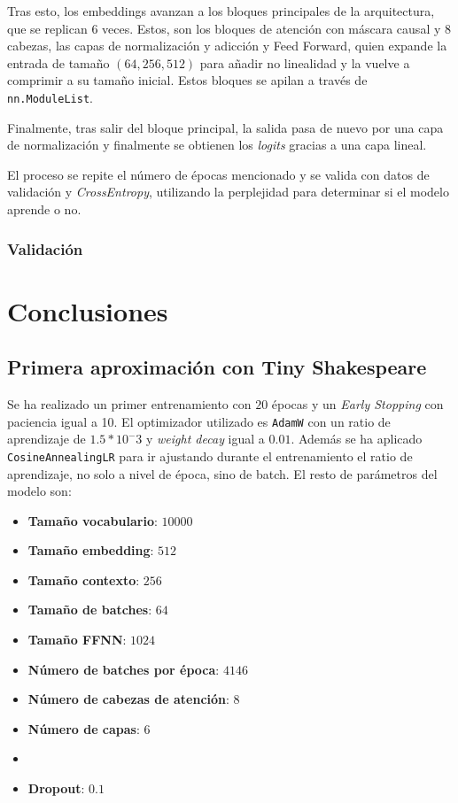 \documentclass[11pt]{book}
\newcommand{\clearemptydoublepage}{\newpage{\pagestyle{empty}\cleardoublepage}}
\theoremstyle{plain}
\theoremstyle{definition}
\begin{document}
Tras esto, los embeddings avanzan a los bloques principales de la arquitectura, que se replican $6$ veces. Estos, son los bloques de atención con máscara causal y 8 cabezas, las capas de normalización y adicción y Feed Forward, quien expande la entrada de tamaño $(64,256, 512)$ para añadir no linealidad y la vuelve a comprimir a su tamaño inicial. Estos bloques se apilan a través de \texttt{nn.ModuleList}. 

Finalmente, tras salir del bloque principal, la salida pasa de nuevo por una capa de normalización y finalmente se obtienen los \textit{logits} gracias a una capa lineal. 

El proceso se repite el número de épocas mencionado y se valida con datos de validación y \textit{CrossEntropy}, utilizando la perplejidad para determinar si el modelo aprende o no.


\subsection{Validación} \label{subsec:validacion}






\clearemptydoublepage

\chapter{Conclusiones}

\section{Primera aproximación con Tiny Shakespeare}

Se ha realizado un primer entrenamiento con $20$ épocas y un \textit{Early Stopping} con paciencia igual a 10. El optimizador utilizado es \texttt{AdamW} con un ratio de aprendizaje de $1.5*10^-3$ y \textit{weight decay} igual a $0.01$. Además se ha aplicado \texttt{CosineAnnealingLR} para ir ajustando durante el entrenamiento el ratio de aprendizaje, no solo a nivel de época, sino de batch. El resto de parámetros del modelo son: 

\begin{itemize}
    \item \textbf{Tamaño vocabulario}: $10000$
    \item \textbf{Tamaño embedding}: $512$
    \item \textbf{Tamaño contexto}: $256$
    \item \textbf{Tamaño de batches}: $64$
    \item \textbf{Tamaño FFNN}: $1024$
    \item \textbf{Número de batches por época}: $4146$
    \item \textbf{Número de cabezas de atención}: $8$
    \item \textbf{Número de capas}: $6$
    \item \item \textbf{Dropout}: $0.1$
\end{itemize}
\end{document}

